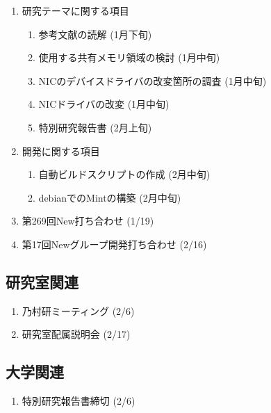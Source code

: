 \documentclass[fleqn, 14pt]{extarticle}
\begin{document}
\begin{enumerate}
\item 研究テーマに関する項目
\hfill
\begin{enumerate}


\item 参考文献の読解
\hfill
(1月下旬)

\item 使用する共有メモリ領域の検討
\hfill
(1月中旬)

\item NICのデバイスドライバの改変箇所の調査
\hfill
(1月中旬)

\item NICドライバの改変
\hfill
(1月中旬)

\item 特別研究報告書 
\hfill
(2月上旬)


\end{enumerate}
\item 開発に関する項目
\hfill
\begin{enumerate}

\item 自動ビルドスクリプトの作成
\hfill
(2月中旬)

\item debianでのMintの構築
\hfill
(2月中旬)

\end{enumerate}
\item 第269回New打ち合わせ
\hfill
\label{enum-7}
(1/19)
\item 第17回Newグループ開発打ち合わせ
\hfill
\label{enum-8}
(2/16)
\end{enumerate}

\subsection{研究室関連}
\label{sec-4-2}

\begin{enumerate}


\item 乃村研ミーティング 
\hfill
\label{enum-16}
(2/6)

\item 研究室配属説明会 
\hfill
\label{enum-18}
(2/17)

\end{enumerate}

\subsection{大学関連}
\begin{enumerate}
\item 特別研究報告書締切 
\hfill
\label{enum-17}
(2/6)

\end{enumerate}
\end{document}
